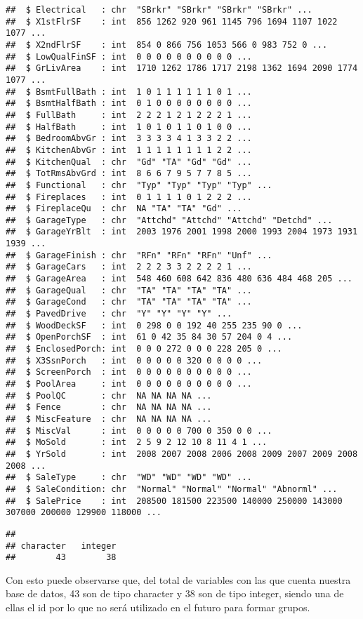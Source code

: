 \documentclass[
]{article}
\begin{document}
\begin{verbatim}
##  $ Electrical   : chr  "SBrkr" "SBrkr" "SBrkr" "SBrkr" ...
##  $ X1stFlrSF    : int  856 1262 920 961 1145 796 1694 1107 1022 1077 ...
##  $ X2ndFlrSF    : int  854 0 866 756 1053 566 0 983 752 0 ...
##  $ LowQualFinSF : int  0 0 0 0 0 0 0 0 0 0 ...
##  $ GrLivArea    : int  1710 1262 1786 1717 2198 1362 1694 2090 1774 1077 ...
##  $ BsmtFullBath : int  1 0 1 1 1 1 1 1 0 1 ...
##  $ BsmtHalfBath : int  0 1 0 0 0 0 0 0 0 0 ...
##  $ FullBath     : int  2 2 2 1 2 1 2 2 2 1 ...
##  $ HalfBath     : int  1 0 1 0 1 1 0 1 0 0 ...
##  $ BedroomAbvGr : int  3 3 3 3 4 1 3 3 2 2 ...
##  $ KitchenAbvGr : int  1 1 1 1 1 1 1 1 2 2 ...
##  $ KitchenQual  : chr  "Gd" "TA" "Gd" "Gd" ...
##  $ TotRmsAbvGrd : int  8 6 6 7 9 5 7 7 8 5 ...
##  $ Functional   : chr  "Typ" "Typ" "Typ" "Typ" ...
##  $ Fireplaces   : int  0 1 1 1 1 0 1 2 2 2 ...
##  $ FireplaceQu  : chr  NA "TA" "TA" "Gd" ...
##  $ GarageType   : chr  "Attchd" "Attchd" "Attchd" "Detchd" ...
##  $ GarageYrBlt  : int  2003 1976 2001 1998 2000 1993 2004 1973 1931 1939 ...
##  $ GarageFinish : chr  "RFn" "RFn" "RFn" "Unf" ...
##  $ GarageCars   : int  2 2 2 3 3 2 2 2 2 1 ...
##  $ GarageArea   : int  548 460 608 642 836 480 636 484 468 205 ...
##  $ GarageQual   : chr  "TA" "TA" "TA" "TA" ...
##  $ GarageCond   : chr  "TA" "TA" "TA" "TA" ...
##  $ PavedDrive   : chr  "Y" "Y" "Y" "Y" ...
##  $ WoodDeckSF   : int  0 298 0 0 192 40 255 235 90 0 ...
##  $ OpenPorchSF  : int  61 0 42 35 84 30 57 204 0 4 ...
##  $ EnclosedPorch: int  0 0 0 272 0 0 0 228 205 0 ...
##  $ X3SsnPorch   : int  0 0 0 0 0 320 0 0 0 0 ...
##  $ ScreenPorch  : int  0 0 0 0 0 0 0 0 0 0 ...
##  $ PoolArea     : int  0 0 0 0 0 0 0 0 0 0 ...
##  $ PoolQC       : chr  NA NA NA NA ...
##  $ Fence        : chr  NA NA NA NA ...
##  $ MiscFeature  : chr  NA NA NA NA ...
##  $ MiscVal      : int  0 0 0 0 0 700 0 350 0 0 ...
##  $ MoSold       : int  2 5 9 2 12 10 8 11 4 1 ...
##  $ YrSold       : int  2008 2007 2008 2006 2008 2009 2007 2009 2008 2008 ...
##  $ SaleType     : chr  "WD" "WD" "WD" "WD" ...
##  $ SaleCondition: chr  "Normal" "Normal" "Normal" "Abnorml" ...
##  $ SalePrice    : int  208500 181500 223500 140000 250000 143000 307000 200000 129900 118000 ...
\end{verbatim}

\begin{verbatim}
## 
## character   integer 
##        43        38
\end{verbatim}

Con esto puede observarse que, del total de variables con las que cuenta
nuestra base de datos, 43 son de tipo character y 38 son de tipo
integer, siendo una de ellas el id por lo que no será utilizado en el
futuro para formar grupos.
\end{document}
